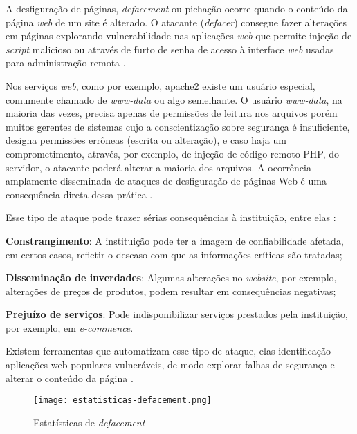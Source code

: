 A desfiguração de páginas, \textit{defacement} ou pichação ocorre quando o conteúdo da página \textit{web} de um site é alterado. O atacante (\textit{defacer}) consegue fazer alterações em páginas explorando vulnerabilidade nas aplicações \textit{web} que permite injeção de \textit{script} malicioso ou através de furto de senha de acesso à interface \textit{web} usadas para administração remota \cite{certs-ataques}.

Nos serviços \textit{web}, como por exemplo, apache2 existe um usuário especial, comumente chamado de \textit{www-data} ou algo semelhante. O usuário \textit{www-data}, na maioria das vezes, precisa apenas de permissões de leitura nos arquivos porém muitos gerentes de sistemas cujo a conscientização sobre segurança é insuficiente, designa permissões errôneas (escrita ou alteração), e caso haja um comprometimento, através, por exemplo, de injeção de código remoto PHP, do servidor, o atacante poderá alterar a maioria dos arquivos. A ocorrência amplamente disseminada de ataques de desfiguração de páginas Web é uma consequência direta dessa prática \cite{seguranca:william-lawrie}.

Esse tipo de ataque pode trazer sérias consequências à instituição, entre elas \cite{esr:tratamento}:

\begin{alineas}
\item \textbf{Constrangimento}: A instituição pode ter a imagem de confiabilidade afetada, em certos casos, refletir o descaso com que as informações críticas são tratadas; 
\item \textbf{Disseminação de inverdades}: Algumas alterações no \textit{website}, por exemplo, alterações de preços de produtos, podem resultar em consequências negativas; 
\item \textbf{Prejuízo de serviços}: Pode indisponibilizar serviços prestados pela instituição, por exemplo, em \textit{e-commence}.
\end{alineas}

Existem ferramentas que automatizam esse tipo de ataque, elas identificação aplicações web populares vulneráveis, de modo explorar falhas de segurança e alterar o conteúdo da página \cite{esr:tratamento}.

\begin{figure}[htb]
 \centering
 \caption{Estatísticas de \textit{defacement}}
 \texttt{[image: estatisticas-defacement.png]}
 \label{fig:estatistica-defacement}
\end{figure}

